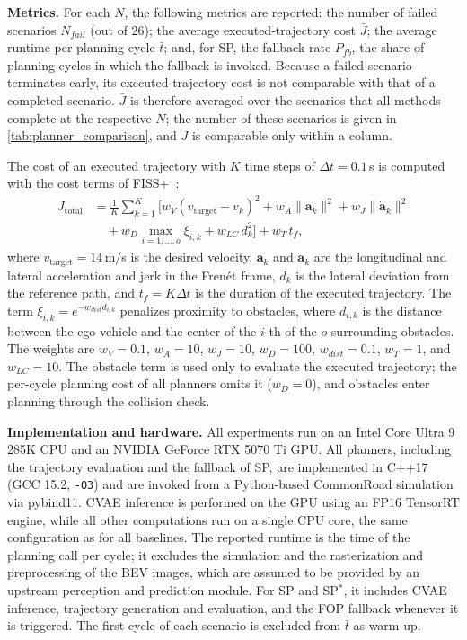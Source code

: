 \textbf{Metrics.}
For each $N$, the following metrics are reported: the number of failed scenarios $N_{fail}$ (out of 26); the average executed-trajectory cost $\bar{J}$; the average runtime per planning cycle $\bar{t}$; and, for SP, the fallback rate $P_{fb}$, the share of planning cycles in which the fallback is invoked.
Because a failed scenario terminates early, its executed-trajectory cost is not comparable with that of a completed scenario.
$\bar{J}$ is therefore averaged over the scenarios that all methods complete at the respective $N$; the number of these scenarios is given in \autoref{tab:planner_comparison}, and $\bar{J}$ is comparable only within a column.

The cost of an executed trajectory with $K$ time steps of $\Delta t = 0.1$\,s is computed with the cost terms of FISS+~\textcite[cf.][Equation (7)]{Sun2023FISSPLUS}:
\begin{equation}
\label{eq:cost_function}
\begin{aligned}
J_{\mathrm{total}} &= \frac{1}{K}\sum_{k=1}^{K} \Big[
w_V (v_{\mathrm{target}}-v_k)^2
+ w_A \lVert \mathbf{a}_k \rVert^2
+ w_J \lVert \dot{\mathbf{a}}_k \rVert^2 \\
&\quad
+ w_D \max_{i=1,\ldots,o} \xi_{i,k}
+ w_{LC}\, d_k^2 \Big]
+ w_T\, t_f ,
\end{aligned}
\end{equation}
where $v_{\mathrm{target}}=14$\,m/s is the desired velocity, $\mathbf{a}_k$ and $\dot{\mathbf{a}}_k$ are the longitudinal and lateral acceleration and jerk in the Fren\'et frame, $d_k$ is the lateral deviation from the reference path, and $t_f=K\Delta t$ is the duration of the executed trajectory.
The term $\xi_{i,k}=e^{-w_{dist} d_{i,k}}$ penalizes proximity to obstacles, where $d_{i,k}$ is the distance between the ego vehicle and the center of the $i$-th of the $o$ surrounding obstacles.
The weights are $w_V=0.1$, $w_A=10$, $w_J=10$, $w_D=100$, $w_{dist}=0.1$, $w_T=1$, and $w_{LC}=10$.
The obstacle term is used only to evaluate the executed trajectory; the per-cycle planning cost of all planners omits it ($w_D=0$), and obstacles enter planning through the collision check.

\textbf{Implementation and hardware.}
All experiments run on an Intel Core Ultra 9 285K CPU and an NVIDIA GeForce RTX 5070 Ti GPU.
All planners, including the trajectory evaluation and the fallback of SP, are implemented in C++17 (GCC 15.2, \texttt{-O3}) and are invoked from a Python-based CommonRoad simulation via pybind11.
CVAE inference is performed on the GPU using an FP16 TensorRT engine, while all other computations run on a single CPU core, the same configuration as for all baselines.
The reported runtime is the time of the planning call per cycle; it excludes the simulation and the rasterization and preprocessing of the BEV images, which are assumed to be provided by an upstream perception and prediction module.
For SP and SP$^{*}$, it includes CVAE inference, trajectory generation and evaluation, and the FOP fallback whenever it is triggered.
The first cycle of each scenario is excluded from $\bar{t}$ as warm-up.

